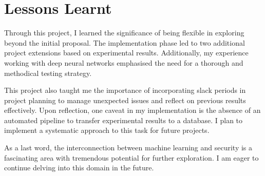 \section{Lessons Learnt}
Through this project, I learned the significance of being flexible in exploring beyond the initial proposal. The implementation phase led to two additional project extensions based on experimental results. Additionally, my experience working with deep neural networks emphasised the need for a thorough and methodical testing strategy.

This project also taught me the importance of incorporating slack periods in project planning to manage unexpected issues and reflect on previous results effectively. Upon reflection, one caveat in my implementation is the absence of an automated pipeline to transfer experimental results to a database. I plan to implement a systematic approach to this task for future projects.

As a last word, the interconnection between machine learning and security is a fascinating area with tremendous potential for further exploration. I am eager to continue delving into this domain in the future.